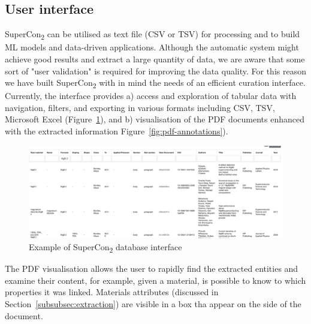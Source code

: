 \documentclass{article}
\begin{document}
\subsection{User interface}
\label{sucsec:supercon2-user-interface}
SuperCon\textsubscript{2} can be utilised as text file (CSV or TSV) for processing and to build ML models and data-driven applications. 
Although the automatic system might achieve good results and extract a large quantity of data, we are aware that some sort of "user validation" is required for improving the data quality. For this reason we have built SuperCon\textsubscript{2} with in mind the needs of an efficient curation interface. 
Currently, the interface provides a) access and exploration of tabular data with navigation, filters, and exporting in various formats including CSV, TSV, Microsoft Excel (Figure~\ref{fig:interface-supercon2}), and b) visualisation of the PDF documents enhanced with the extracted information Figure~\ref{fig:pdf-annotations}). 

\begin{figure}[ht]
\includegraphics[width=\textwidth]{sample-database-interface}
\caption{\label{fig:interface-supercon2} Example of SuperCon\textsubscript{2} database interface}
\end{figure}

The PDF visualisation allows the user to rapidly find the extracted entities and examine their content, for example, given a material, is possible to know to which properties it was linked. 
Materials attributes (discussed in Section~\ref{subsubsec:extraction}) are visible in a box tha appear on the side of the document. 
\end{document}
